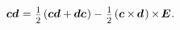 \begin{otherlanguage}{russian}
\nopagebreak\vspace{-0.6em}\begin{equation}\label{symmetricantisymmetricdecompositionofdyad}
\hspace*{1em} \bm{c}\bm{d} \hspace{.1ex} = \hspace{.1ex}
\smalldisplaystyleonehalf \hspace{-0.1ex} \left( \bm{c}\bm{d} + \hspace{-0.1ex} \bm{d}\bm{c} \hspace{.1ex} \right)
- \hspace{.16ex} \smalldisplaystyleonehalf \hspace{-0.1ex} \left( \bm{c} \hspace{-0.1ex} \times \hspace{-0.2ex} \bm{d} \hspace{.2ex} \right) \hspace{-0.12ex} \times \hspace{-0.25ex} \bm{E} \hspace{.1ex} .
\end{equation}

\end{otherlanguage}



\label{para:eigenvectorseigenvalues}

